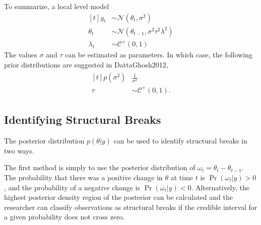 \documentclass{article}
\newcommand{\paren}[1]{\ensuremath{\left(#1\right)}}
\newcommand{\dnorm}[1]{\ensuremath{\mathcal{N}\paren{#1}}}
\newcommand{\dhalfcauchy}[1]{\ensuremath{\mathcal{C}^{+}\paren{#1}}}
\begin{document}
To summarize, a local level model 
\begin{equation}
  \label{eq:3}
  \begin{aligned}[t]
    y_{t} & \sim \dnorm{\theta_{t}, \sigma^{2}} \\
    \theta_{t} & \sim \dnorm{\theta_{t - 1}, \sigma^{2} \tau^{2} \lambda^{2}} \\
    \lambda_{t} & \sim \dhalfcauchy{0, 1}
  \end{aligned}
\end{equation}
The values $\sigma$ and $\tau$ can be estimated as parameters. 
In which case, the following prior distributions are suggested in \textcite{CarvalhoPolsonScott2010}{DattaGhosh2012},
\begin{align}
  \label{eq:9}
  \begin{aligned}[t]
    p(\sigma^{2}) & \frac{1}{\sigma^{2}}  \\
    \tau &\sim \dhalfcauchy{0, 1} \text{.}
  \end{aligned}
\end{align}

\subsection{Identifying Structural Breaks}
\label{sec:ident-struct-breaks}

The posterior distribution $p(\theta | y)$ can be used to identify structural breaks in two ways. 

The first method is simply to use the posterior distribution of $\omega_{t} = \theta_{t} - \theta_{t-1}$.
The probability that there was a positive change in $\theta$ at time $t$ is
$\Pr(\omega_{t} | y) > 0$, and the probability of a negative change is $\Pr(\omega_{t} | y) < 0$.
Alternatively, the highest posterior density region of the posterior can be calculated and the researcher can classify observations as structural breaks if the credible interval for a given probability does not cross zero.
\end{document}
